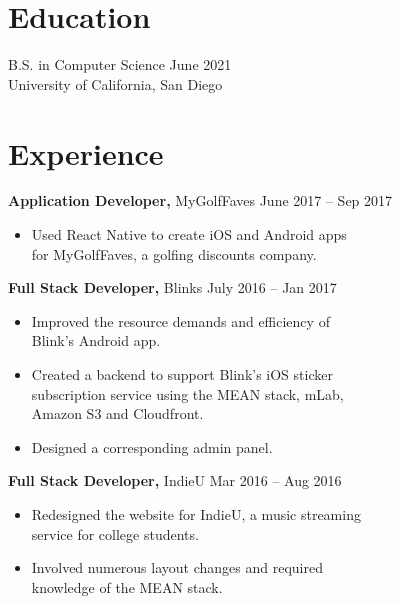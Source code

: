 \documentclass[margin]{res}
\begin{document}
 
 
 
\address{{\bf Contact Information} \\ 
	Email: dmhacker@yahoo.com \\ 
	Website: dmhacker.github.io  \\
        Phone: (805) 368-5071 }
\address{{\bf Present Address} \\ 
	\#60318 9450 Gilman Dr.  \\
        La Jolla, CA 92092-0100 }

\begin{resume} 

\section{Education} 
B.S. in Computer Science \hfill June 2021 \\
University of California, San Diego

\section{Experience}
 {\bf Application Developer,} MyGolfFaves \hfill June 2017 – Sep 2017
 \begin{itemize} \itemsep -2pt  %
 \item Used React Native to create iOS and Android apps \\
                 for MyGolfFaves, a golfing discounts company.
 \end{itemize}
 
{\bf Full Stack Developer,} Blinks \hfill July 2016 – Jan 2017
\begin{itemize} \itemsep -2pt %
\item  Improved the resource demands and efficiency of \\
		Blink's Android app.
\item  Created a backend to support Blink's iOS sticker \\
		subscription service using the MEAN stack, mLab, \\ 
		Amazon S3 and Cloudfront.
\item  Designed a corresponding admin panel.
\end{itemize}

{\bf Full Stack Developer,} IndieU \hfill Mar 2016 – Aug 2016       
\begin{itemize} \itemsep -2pt
\item  Redesigned the website for IndieU, a music streaming \\ 
		service for college students. 
\item Involved numerous layout changes and required \\ 
		knowledge of the MEAN stack.
\end{itemize}


\end{resume}
\end{document}
